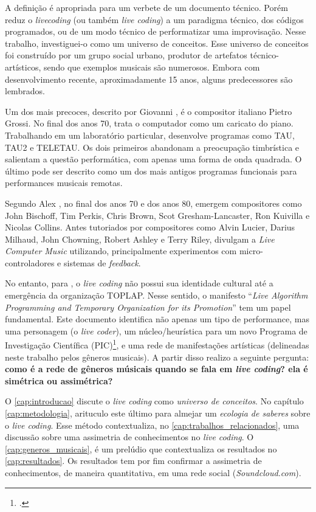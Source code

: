 A definição é apropriada para um verbete de um documento técnico. Porém reduz  o \emph{livecoding} (ou também \emph{live coding}) a um paradigma técnico, dos códigos programados, ou de um modo técnico de performatizar uma improvisação. Nesse trabalho, investiguei-o como um universo de conceitos. Esse universo de conceitos foi construído por um grupo social urbano, produtor de artefatos técnico-artísticos, sendo que exemplos musicais são numerosos. Embora com desenvolvimento recente, aproximadamente 15 anos, alguns predecessores são lembrados.

Um dos mais precoces, descrito por Giovanni , é o compositor italiano Pietro Grossi. No final dos anos 70, trata o computador como um caricato do piano. Trabalhando em um laboratório particular, desenvolve programas como TAU, TAU2 e TELETAU. Os dois primeiros abandonam a preocupação timbrística e salientam a questão performática, com apenas uma forma de onda quadrada. O último pode ser descrito como um dos mais antigos programas funcionais para performances musicais remotas.

Segundo Alex , no final dos anos 70 e dos anos 80, emergem compositores como John Bischoff, Tim Perkis, Chris Brown, Scot Gresham-Lancaster, Ron Kuivilla e Nicolas Collins. Antes tutoriados por compositores como Alvin Lucier, Darius Milhaud, John Chowning, Robert Ashley e Terry Riley, divulgam a \emph{Live Computer Music} utilizando, principalmente experimentos com micro-controladores e sistemas de \emph{feedback}.

No entanto, para , o \emph{live coding} não possui sua identidade cultural até a emergência da organização TOPLAP. Nesse sentido, o manifesto ``\emph{Live Algorithm Programming and Temporary Organization for its Promotion}'' tem um papel fundamental. Este documento identifica não apenas um tipo de performance, mas uma personagem (o \emph{live coder}), um núcleo/heurística para um novo Programa de Investigação Científica (PIC)\footnote{.}, e uma rede de manifestações artísticas (delineadas neste trabalho pelos gêneros musicais). A partir disso realizo a seguinte pergunta: \textbf{como é a rede de gêneros músicais quando se fala em \emph{live coding}? ela é simétrica ou assimétrica?}

O \autoref{cap:introducao} discute o \emph{live coding} como \emph{universo de conceitos}. No capítulo \autoref{cap:metodologia}, arituculo este último para almejar um \emph{ecologia de saberes} sobre o \emph{live coding}. Esse método contextualiza, no \autoref{cap:trabalhos_relacionados}, uma discussão sobre uma assimetria de conhecimentos no \emph{live coding}. O \autoref{cap:generos_musicais}, é um prelúdio que contextualiza os resultados no \autoref{cap:resultados}. Os resultados tem por fim confirmar a assimetria de conhecimentos, de maneira quantitativa, em uma rede social (\emph{Soundcloud.com}).